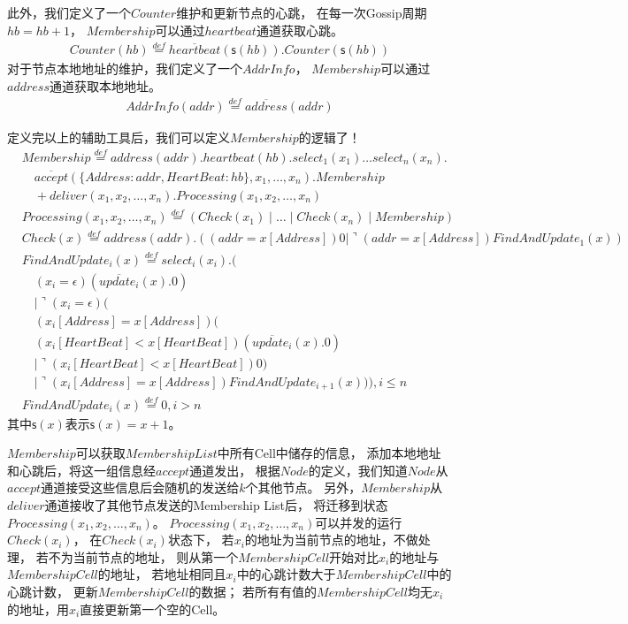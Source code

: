 此外，我们定义了一个$Counter$维护和更新节点的心跳，
在每一次Gossip周期$hb=hb+1$，
$Membership$可以通过$heartbeat$通道获取心跳。
\begin{align*}
   Counter(hb)\stackrel{def}{=}\overline{heartbeat}(\mathsf{s}(hb)).Counter(\mathsf{s}(hb))
\end{align*}
对于节点本地地址的维护，我们定义了一个$AddrInfo$，
$Membership$可以通过$address$通道获取本地地址。
\begin{align*}
   AddrInfo(addr)\stackrel{def}{=}\overline{address}(addr)
\end{align*}

定义完以上的辅助工具后，我们可以定义$Membership$的逻辑了！
\begin{align*}
    &Membership\stackrel{def}{=}address(addr).heartbeat(hb).select_1(x_1)\dots select_n(x_n).\\
    &\quad\overline{accept}(\{Address:addr,HeartBeat:hb\},x_1,\dots,x_n).Membership\\
    &\quad+deliver(x_1,x_2,\dots,x_n).Processing(x_1,x_2,\dots,x_n)\\
    &Processing(x_1,x_2,\dots,x_n)\stackrel{def}{=}(Check(x_1)\mid  \dots \mid Check(x_n) \mid Membership)\\
    &Check(x)\stackrel{def}{=}address(addr).((addr=x[Address])0|\urcorner(addr=x[Address])FindAndUpdate_1(x))\\
    &FindAndUpdate_i(x)\stackrel{def}{=}select_i(x_i).(\\
    &\quad(x_i = \epsilon) (\overline{update_i}(x).0)\\
    &\quad| \urcorner(x_i = \epsilon)(\\
    &\quad(x_i[Address]=x[Address])(\\
    &\quad(x_i[HeartBeat]<x[HeartBeat])(\overline{update_i}(x).0)\\
    &\quad\mid \urcorner (x_i[HeartBeat]<x[HeartBeat])0)\\
    &\quad\mid \urcorner (x_i[Address]=x[Address])FindAndUpdate_{i+1}(x))),i\leq n\\
    &FindAndUpdate_i(x)\stackrel{def}{=}0,i>n
\end{align*}
其中$\mathsf{s}(x)$表示$\mathsf{s}(x)=x+1$。

$Membership$可以获取$MembershipList$中所有Cell中储存的信息，
添加本地地址和心跳后，将这一组信息经$accept$通道发出，
根据$Node$的定义，我们知道$Node$从$accept$通道接受这些信息后会随机的发送给$k$个其他节点。
另外，$Membership$从$deliver$通道接收了其他节点发送的Membership List后，
将迁移到状态$Processing(x_1,x_2,\dots,x_n)$。
$Processing(x_1,x_2,\dots,x_n)$可以并发的运行$Check(x_i)$，
在$Check(x_i)$状态下，
若$x_i$的地址为当前节点的地址，不做处理，
若不为当前节点的地址，
则从第一个$MembershipCell$开始对比$x_i$的地址与$MembershipCell$的地址，
若地址相同且$x_i$中的心跳计数大于$MembershipCell$中的心跳计数，
更新$MembershipCell$的数据；
若所有有值的$MembershipCell$均无$x_i$的地址，用$x_i$直接更新第一个空的Cell。


